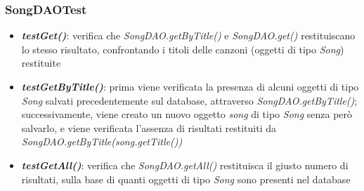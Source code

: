 \documentclass{article}
\begin{document}
  \subsubsection{SongDAOTest}
  \begin{itemize}

    \item \textbf{\textit{testGet()}}: verifica che \textit{SongDAO.getByTitle()} e \textit{SongDAO.get()} restituiscano lo stesso risultato, confrontando i titoli delle canzoni (oggetti di tipo \textit{Song}) restituite

    \item \textbf{\textit{testGetByTitle()}}: prima viene verificata la presenza di alcuni oggetti di tipo \textit{Song} salvati precedentemente sul database, attraverso \textit{SongDAO.getByTitle()}; successivamente, viene creato un nuovo oggetto \textit{song} di tipo \textit{Song} senza però salvarlo, e viene verificata l'assenza di risultati restituiti da \textit{SongDAO.getByTitle(song.getTitle())}

    \item \textbf{\textit{testGetAll()}}: verifica che \textit{SongDAO.getAll()} restituisca il giusto numero di risultati, sulla base di quanti oggetti di tipo \textit{Song} sono presenti nel database

  \end{itemize}
\end{document}

